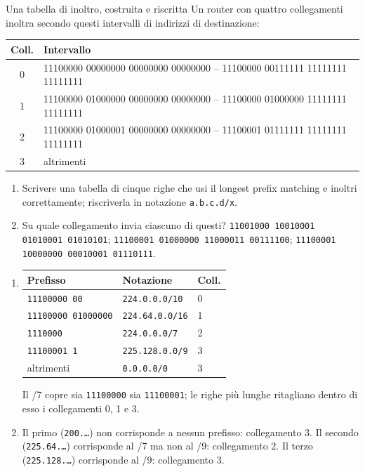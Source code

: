 \begin{esercizio}{Una tabella di inoltro, costruita e riscritta}
Un router con quattro collegamenti inoltra secondo questi intervalli di indirizzi di destinazione:
\begin{center}
\small\ttfamily
\begin{tabular}{cl}
\toprule
\textrm{\textbf{Coll.}} & \textrm{\textbf{Intervallo}} \\
\midrule
0 & 11100000 00000000 00000000 00000000 -- 11100000 00111111 11111111 11111111 \\
1 & 11100000 01000000 00000000 00000000 -- 11100000 01000000 11111111 11111111 \\
2 & 11100000 01000001 00000000 00000000 -- 11100001 01111111 11111111 11111111 \\
3 & \textrm{altrimenti} \\
\bottomrule
\end{tabular}
\end{center}
\begin{enumerate}[label=(\alph*)]
    \item Scrivere una tabella di cinque righe che usi il longest prefix matching e inoltri correttamente; riscriverla in notazione
          \texttt{a.b.c.d/x}.
    \item Su quale collegamento invia ciascuno di questi? \texttt{11001000 10010001 01010001 01010101};
          \texttt{11100001 01000000 11000011 00111100}; \texttt{11100001 10000000 00010001 01110111}.
\end{enumerate}

\svolgimento
\begin{enumerate}[label=(\alph*)]
    \item \begin{tabular}[t]{lll}
          \toprule
          \textbf{Prefisso} & \textbf{Notazione} & \textbf{Coll.} \\
          \midrule
          \texttt{11100000 00} & \texttt{224.0.0.0/10} & 0 \\
          \texttt{11100000 01000000} & \texttt{224.64.0.0/16} & 1 \\
          \texttt{1110000} & \texttt{224.0.0.0/7} & 2 \\
          \texttt{11100001 1} & \texttt{225.128.0.0/9} & 3 \\
          altrimenti & \texttt{0.0.0.0/0} & 3 \\
          \bottomrule
          \end{tabular}

          Il /7 copre sia \texttt{11100000} sia \texttt{11100001}; le righe più lunghe ritagliano dentro di esso i collegamenti 0, 1 e 3.
    \item Il primo (\texttt{200.\dots}) non corrisponde a nessun prefisso: collegamento 3. Il secondo (\texttt{225.64.\dots}) corrisponde
          al /7 ma non al /9: collegamento 2. Il terzo (\texttt{225.128.\dots}) corrisponde al /9: collegamento 3.
\end{enumerate}
\end{esercizio}

